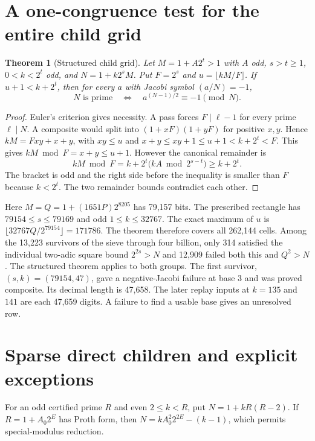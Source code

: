 \documentclass[11pt,a4paper,oneside,openany]{report}
\newtheorem{theorem}{Theorem}[chapter]
\begin{document}
\section{A one-congruence test for the entire child grid}

\begin{theorem}[Structured child grid]\label{cer:childgrid}
Let $M=1+A2^t>1$ with $A$ odd, $s>t\ge1$, $0<k<2^t$ odd, and $N=1+k2^s M$. Put $F=2^s$ and $u=\lfloor kM/F\rfloor$. If $u+1<k+2^t$, then for every $a$ with Jacobi symbol $(a/N)=-1$,
\[
 N\text{ is prime}\quad\Longleftrightarrow\quad a^{(N-1)/2}\equiv-1\pmod N.
\]
\end{theorem}
\begin{proof}
Euler's criterion gives necessity. A pass forces $F\mid\ell-1$ for every prime $\ell\mid N$. A composite would split into $(1+xF)(1+yF)$ for positive $x,y$. Hence $kM=Fxy+x+y$, with $xy\le u$ and $x+y\le xy+1\le u+1<k+2^t<F$. This gives $kM\bmod F=x+y\le u+1$. However the canonical remainder is
\[
 kM\bmod F=k+2^t\bigl(kA\bmod 2^{s-t}\bigr)\ge k+2^t.
\]
The bracket is odd and the right side before the inequality is smaller than $F$ because $k<2^t$. The two remainder bounds contradict each other.
\end{proof}

Here $M=Q=1+(1651P)2^{8205}$ has 79,157 bits. The prescribed rectangle has $79154\le s\le79169$ and odd $1\le k\le32767$. The exact maximum of $u$ is $\lfloor32767Q/2^{79154}\rfloor=171786$. The theorem therefore covers all 262,144 cells. Among the 13,223 survivors of the sieve through four billion, only 314 satisfied the individual two-adic square bound $2^{2s}>N$ and 12,909 failed both this and $Q^2>N$. The structured theorem applies to both groups. The first survivor, $(s,k)=(79154,47)$, gave a negative-Jacobi failure at base 3 and was proved composite. Its decimal length is 47,658. The later replay inputs at $k=135$ and $141$ are each 47,659 digits. A failure to find a usable base gives an unresolved row.

\section{Sparse direct children and explicit exceptions}

For an odd certified prime $R$ and even $2\le k<R$, put $N=1+kR(R-2)$. If $R=1+A_0 2^E$ has Proth form, then $N=kA_0^2 2^{2E}-(k-1)$, which permits special-modulus reduction.
\end{document}
